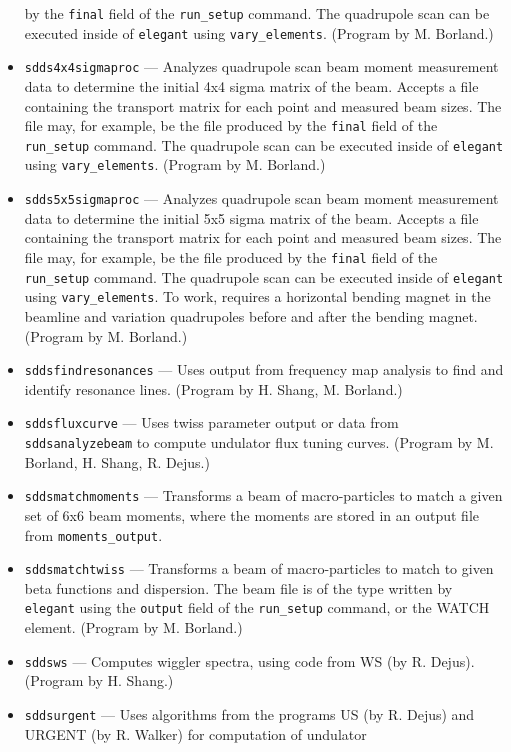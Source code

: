 \documentclass[11pt]{article}
\begin{document}
\begin{itemize}
        by the {\tt final} field of the {\tt run\_setup} command.  The quadrupole scan can be
        executed inside of {\tt elegant} using {\tt vary\_elements}. (Program by M. Borland.)
\item {\tt sdds4x4sigmaproc} --- Analyzes quadrupole scan beam moment measurement data to determine
  the initial 4x4 sigma matrix of the beam.  Accepts a
  file containing the transport matrix for each point and measured beam sizes.  
  The file may, for example, be the file produced
  by the {\tt final} field of the {\tt run\_setup} command.  The quadrupole scan can be
  executed inside of {\tt elegant} using {\tt vary\_elements}. (Program by M. Borland.)
\item {\tt sdds5x5sigmaproc} --- Analyzes quadrupole scan beam moment measurement data to determine
  the initial 5x5 sigma matrix of the beam.  Accepts a
  file containing the transport matrix for each point and measured beam sizes.  
  The file may, for example, be the file produced
  by the {\tt final} field of the {\tt run\_setup} command.  The quadrupole scan can be
  executed inside of {\tt elegant} using {\tt vary\_elements}. To work, requires a horizontal bending magnet
  in the beamline and variation quadrupoles before and after the bending magnet. (Program by M. Borland.)
\item {\tt sddsfindresonances} --- Uses output from frequency map analysis to find and identify resonance lines.
 (Program by H. Shang, M. Borland.)
\item {\tt sddsfluxcurve} --- Uses twiss parameter output or data from {\tt sddsanalyzebeam} to
  compute undulator flux tuning curves.  (Program by M. Borland, H. Shang, R. Dejus.)
\item {\tt sddsmatchmoments} --- Transforms a beam of macro-particles to match a given set of 
  6x6 beam moments, where the moments are stored in an output file from \verb|moments_output|.
\item {\tt sddsmatchtwiss} --- Transforms a beam of macro-particles to match to given beta
        functions and dispersion.    The beam file
        is of the type written by {\tt elegant} using the {\tt output} field of the {\tt run\_setup}
        command, or the WATCH element. (Program by M. Borland.)
\item {\tt sddsws} --- Computes wiggler spectra, using code from WS (by R. Dejus).
  (Program by H. Shang.)
\item {\tt sddsurgent} --- Uses algorithms from the programs US (by R. Dejus) and URGENT (by R. Walker) for computation of undulator

\end{itemize}
\end{document}
